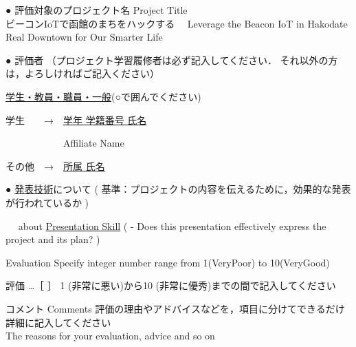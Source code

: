 \documentclass[a4,12pt]{jarticle}
\begin{document}
\begin{description}
\item{●} 評価対象のプロジェクト名 Project Title \\
ビーコンIoTで函館のまちをハックする \ \ Leverage the Beacon IoT in Hakodate Real Downtown for Our Smarter Life
\item{●} 評価者 {\footnotesize （プロジェクト学習履修者は必ず記入してください．
それ以外の方は，よろしければご記入ください）}
\begin{description}
\item{} \underline{学生・教員・職員・一般}{\footnotesize (○で囲んでください) }
\item{} 学生　　→　\underline{学年\hspace{2cm} 学籍番号\hspace{3cm} 氏名\hspace{5cm}}
\item{} 　　　　　　Affiliate\hspace{62mm} Name\hspace{5cm} \vspace*{-3mm}
\item{} その他　→　\underline{所属\hspace{67.5mm} 氏名\hspace{5cm}}
\end{description}

\item{●} \underline{発表技術}について
{\footnotesize ( 基準：プロジェクトの内容を伝えるために，効果的な発表が行われているか )}
\vspace*{-4mm}
\item{　} about \underline{Presentation Skill}
{\footnotesize ( - Does this presentation effectively express the project and its plan? )}
\begin{description}
\item{}  Evaluation \hspace{19mm}
{\footnotesize  Specify integer number range from {\normalsize 1}(VeryPoor)
to {\normalsize 10}(VeryGood)}
\vspace*{-3mm}
\item{}  評価 …［ \hspace{10mm} ］\hspace{5mm}
{\footnotesize {\normalsize 1} (非常に悪い)から{\normalsize 10} (非常に優秀)までの間で記入してください}
\vspace{-3mm}
\end{description}

\begin{itembox}[l]{コメント Comments}
\vspace*{-3mm} \hfill {\footnotesize
評価の理由やアドバイスなどを，項目に分けてできるだけ詳細に記入してください
} \vspace*{-2mm} \\
\hfill {\footnotesize The reasons for your evaluation, advice and so on}
\vspace{45mm}
\end{itembox}


\end{description}
\end{document}
